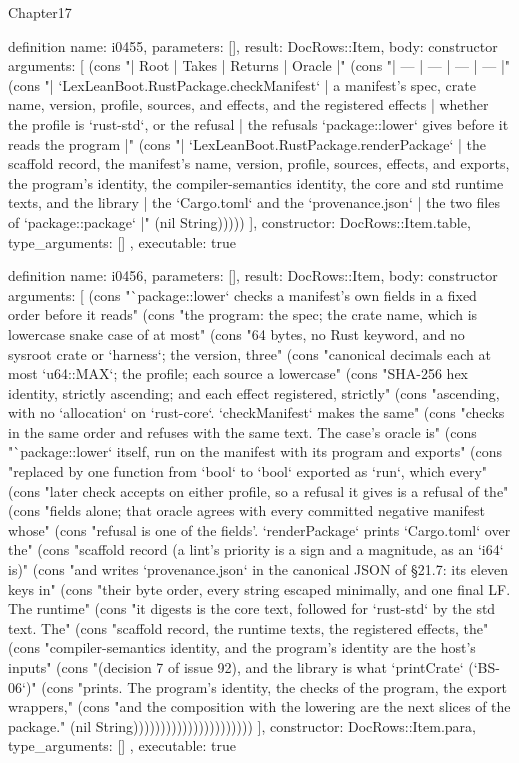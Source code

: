 \begin{lexlean}{Chapter17}
\begin{semanticmodule}
definition{
  name: i0455,
  parameters: [],
  result: DocRows::Item,
  body: constructor{
    arguments: [
      (cons "| Root | Takes | Returns | Oracle |" (cons "| --- | --- | --- | --- |" (cons "| `LexLeanBoot.RustPackage.checkManifest` | a manifest's spec, crate name, version, profile, sources, and effects, and the registered effects | whether the profile is `rust-std`, or the refusal | the refusals `package::lower` gives before it reads the program |" (cons "| `LexLeanBoot.RustPackage.renderPackage` | the scaffold record, the manifest's name, version, profile, sources, effects, and exports, the program's identity, the compiler-semantics identity, the core and std runtime texts, and the library | the `Cargo.toml` and the `provenance.json` | the two files of `package::package` |" (nil String)))))
    ],
    constructor: DocRows::Item.table,
    type_arguments: []
  },
  executable: true
}

definition{
  name: i0456,
  parameters: [],
  result: DocRows::Item,
  body: constructor{
    arguments: [
      (cons "`package::lower` checks a manifest's own fields in a fixed order before it reads" (cons "the program: the spec; the crate name, which is lowercase snake case of at most" (cons "64 bytes, no Rust keyword, and no sysroot crate or `harness`; the version, three" (cons "canonical decimals each at most `u64::MAX`; the profile; each source a lowercase" (cons "SHA-256 hex identity, strictly ascending; and each effect registered, strictly" (cons "ascending, with no `allocation` on `rust-core`. `checkManifest` makes the same" (cons "checks in the same order and refuses with the same text. The case's oracle is" (cons "`package::lower` itself, run on the manifest with its program and exports" (cons "replaced by one function from `bool` to `bool` exported as `run`, which every" (cons "later check accepts on either profile, so a refusal it gives is a refusal of the" (cons "fields alone; that oracle agrees with every committed negative manifest whose" (cons "refusal is one of the fields'. `renderPackage` prints `Cargo.toml` over the" (cons "scaffold record (a lint's priority is a sign and a magnitude, as an `i64` is)" (cons "and writes `provenance.json` in the canonical JSON of §21.7: its eleven keys in" (cons "their byte order, every string escaped minimally, and one final LF. The runtime" (cons "it digests is the core text, followed for `rust-std` by the std text. The" (cons "scaffold record, the runtime texts, the registered effects, the" (cons "compiler-semantics identity, and the program's identity are the host's inputs" (cons "(decision 7 of issue 92), and the library is what `printCrate` (`BS-06`)" (cons "prints. The program's identity, the checks of the program, the export wrappers," (cons "and the composition with the lowering are the next slices of the package." (nil String))))))))))))))))))))))
    ],
    constructor: DocRows::Item.para,
    type_arguments: []
  },
  executable: true
}


\end{semanticmodule}
\end{lexlean}
